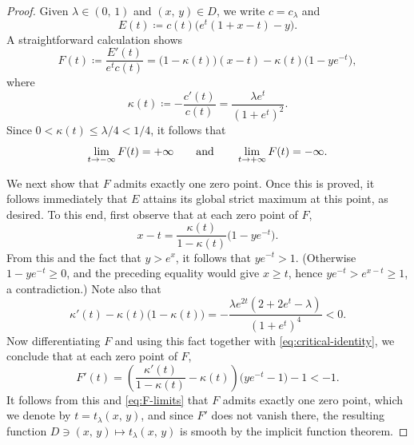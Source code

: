 \documentclass[12pt,a4paper]{amsart}
\numberwithin{equation}{section}
\theoremstyle{definition}
\begin{document}
\begin{proof}
Given $\lambda\in(0,\, 1)$ and $(x,\, y)\in D$, we write $c=c_{\lambda}$ and
   $$
   E(t)\coloneqq c(t)\bigl(e^{t}(1+x-t)-y\bigr).
   $$
A straightforward calculation shows
   $$
   F(t)\coloneqq \frac{E'(t)}{e^{t}c(t)}
   =\bigl(1-\kappa(t)\bigr)(x-t)-\kappa(t)\bigl(1-ye^{-t}\bigr),
   $$
where
   $$
   \kappa(t)\coloneqq -\frac{c'(t)}{c(t)}=\frac{\lambda e^{t}}{(1+e^{t})^{2}}.
   $$
Since $0<\kappa(t)\leq \lambda/4 <1/4$, it follows that
 \begin{equation}\label{eq:F-limits}
    \lim_{t\to-\infty}F(t)=+\infty  \qquad {\rm and } \qquad \lim_{t\to+\infty}F(t)=-\infty.
 \end{equation}

We next show that $F$ admits exactly one zero point. Once this is proved, it follows immediately that $E$ attains its global strict maximum at this point,
as desired. To this end, first observe that at each zero point of $F$,
  \begin{equation}\label{eq:critical-identity}
    x-t = \frac{\kappa(t)}{1-\kappa(t)}\bigl(1-ye^{-t}\bigr).
  \end{equation}
From this and the fact that $y>e^{x}$, it follows that $ye^{-t}>1$. (Otherwise $1-ye^{-t}\geq0$, and the preceding equality would give $x\geq t$, hence $ye^{-t}>e^{x-t}\geq1$, a contradiction.) Note also that
   $$
    \kappa'(t)-\kappa(t)\bigl(1-\kappa(t)\bigr)
    =
    -\frac{\lambda e^{2t}(2+2e^{t}-\lambda)}{(1+e^{t})^{4}}
    <0.
   $$
Now differentiating $F$ and using this fact together with \eqref{eq:critical-identity}, we conclude that at each zero point of $F$,
  $$
  F'(t)=\left(\frac{\kappa'(t)}{1-\kappa(t)}-\kappa(t) \right)\bigl(ye^{-t}-1\bigr)-1 <-1.
  $$
It follows from this and \eqref{eq:F-limits} that $F$ admits exactly one zero point, which we denote by $t=t_{\lambda}(x,\,y)$,  and since $F'$ does not vanish there, the resulting
function $D\ni (x,\,y)\mapsto t_{\lambda}(x,\,y)$ is smooth by the implicit function theorem.


\end{proof}
\end{document}

